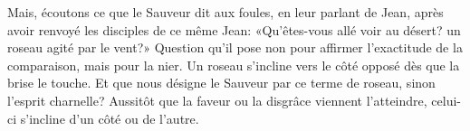Mais, écoutons ce que le Sauveur dit aux foules, en leur parlant de Jean,
	après avoir renvoyé les disciples de ce même Jean:
	«Qu’êtes-vous allé voir au désert? un roseau agité par le vent?»
Question qu’il pose non pour affirmer l’exactitude de la comparaison,
	mais pour la nier.
Un roseau s’incline vers le côté opposé dès que la brise le touche.
Et que nous désigne le Sauveur par ce terme de roseau,
	sinon l’esprit charnelle?
Aussitôt que la faveur ou la disgrâce viennent l’atteindre,
	celui-ci s’incline d’un côté ou de l’autre.
